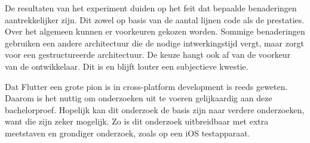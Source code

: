 De resultaten van het experiment duiden op het feit dat bepaalde benaderingen aantrekkelijker zijn. Dit zowel op basis van de aantal lijnen code als de prestaties. Over het algemeen kunnen er voorkeuren gekozen worden. Sommige benaderingen gebruiken een andere architectuur die de nodige intwerkingstijd vergt, maar zorgt voor een gestructureerde architectuur. De keuze hangt ook af van de voorkeur van de ontwikkelaar. Dit is en blijft louter een subjectieve kwestie.\newline

Dat Flutter een grote pion is in cross-platform development is reeds geweten. Daarom is het nuttig om onderzoeken uit te voeren gelijkaardig aan deze bachelorproef. Hopelijk kan dit onderzoek de basis zijn naar verdere onderzoeken, want die zijn zeker mogelijk. Zo is dit onderzoek uitbreidbaar met extra meetstaven en grondiger onderzoek, zoals op een iOS testapparaat.
